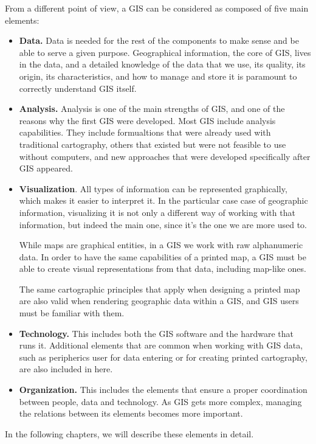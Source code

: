 From a different point of view, a GIS can be considered as composed of five main elements:


\begin{itemize}
 \item \textbf{Data.} Data is needed for the rest of the components to make sense and be able to serve a given purpose. Geographical information, the core of GIS, lives in the data, and a detailed knowledge of the data that we use, its quality, its origin, its characteristics, and how to manage and store it is paramount to correctly understand GIS itself.

\item \textbf{Analysis.} Analysis is one of the main strengths of GIS, and one of the reasons why the first GIS were developed. Most GIS include analysis capabilities. They include formualtions that were already used with traditional cartography, others that existed but were not feasible to use without computers, and new approaches that were developed specifically after GIS appeared.

\item \textbf{Visualization}. All types of information can be represented graphically, which makes it easier to interpret it. In the particular case case of geographic information, visualizing it is not only a different way of working with that information, but indeed the main one, since it's the one we are more used to.

While maps are graphical entities, in a GIS we work with raw alphanumeric data. In order to have the same capabilities of a printed map, a GIS must be able to create visual representations from that data, including map-like ones.

The same cartographic principles that apply when designing a printed map are also valid when rendering geographic data within a GIS, and GIS users must be familiar with them. 

\item \textbf{Technology.} This includes both the GIS software and the hardware that runs it. Additional elements that are common when working with GIS data, such as peripherics user for data entering or for creating printed cartography, are also included in here.

\item \textbf{Organization.} This includes the elements that ensure a proper coordination between people, data and technology. As GIS gets more complex, managing the relations between its elements becomes more important.
\end{itemize}

In the following chapters, we will describe these elements in detail.




\pagestyle{empty}